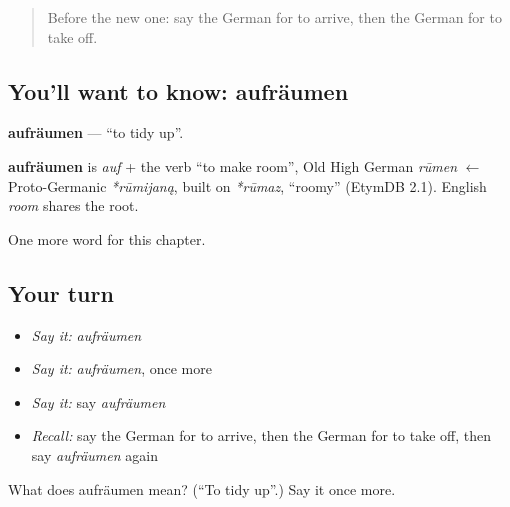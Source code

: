 \label{lesson:GE-C174-aufraeumen}



\begin{quote}
Before the new one: say the German for to arrive, then the German for to take off.
\end{quote}

\subsection*{You'll want to know: aufräumen}
\textbf{aufräumen} — \textquotedblleft{}to tidy up\textquotedblright{}.

\begin{cousinweb}
\textbf{aufräumen} is \emph{auf} + the verb \textquotedblleft{}to make room\textquotedblright{}, Old High German \emph{rūmen} $\leftarrow$ Proto-Germanic \emph{*rūmijaną}, built on \emph{*rūmaz}, \textquotedblleft{}roomy\textquotedblright{} (EtymDB 2.1). English \emph{room} shares the root.
\end{cousinweb}

\begin{grammarlens}[title={What you've built}]
One more word for this chapter.
\end{grammarlens}

\subsection*{Your turn}
\begin{itemize}
\raggedright
  \item \emph{Say it:} \emph{aufräumen}
  \item \emph{Say it:} \emph{aufräumen}, once more
  \item \emph{Say it:} say \emph{aufräumen}
  \item \emph{Recall:} say the German for to arrive, then the German for to take off, then say \emph{aufräumen} again
\end{itemize}

\begin{tcolorbox}[breakable,colback=teal!4,colframe=teal!35!black,title={Before you move on}]
What does aufräumen mean? (\textquotedblleft{}To tidy up\textquotedblright{}.) Say it once more.
\end{tcolorbox}
